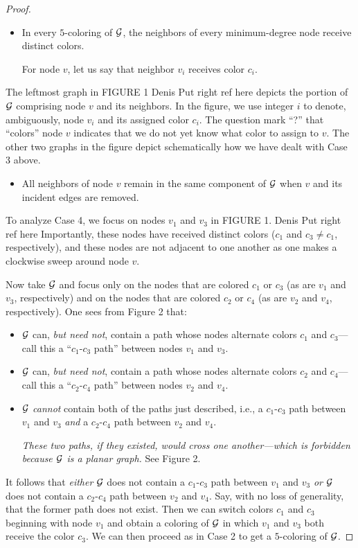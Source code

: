 {\begin{proof}
\begin{description}
\begin{itemize}
For the minimum-degree node $v$, let us call these neighbors $v_1$,
$v_2$, $v_3$, $v_4$, $v_5$, in clockwise order within the planar
drawing.
\item
In every $5$-coloring of $\mbox{$\cal G$}$, the neighbors of every minimum-degree
node receive distinct colors.

For node $v$, let us say that neighbor $v_i$ receives color $c_i$.
\end{itemize}
The leftmost graph in FIGURE 1 
{Denis Put right ref here}
depicts the portion of $\mbox{$\cal G$}$ comprising
node $v$ and its neighbors.  In the figure, we use integer $i$ to
denote, ambiguously, node $v_i$ and its assigned color $c_i$.  The
question mark ``?'' that ``colors'' node $v$ indicates that we do not
yet know what color to assign to $v$.  The other two graphs in the
figure depict schematically how we have dealt with Case 3 above.
\begin{itemize}
\item
All neighbors of node $v$ remain in the same component of $\mbox{$\cal G$}$ when
$v$ and its incident edges are removed.
\end{itemize}
\end{description}
To analyze Case 4, we focus on nodes $v_1$ and $v_3$ in FIGURE 1.
{Denis Put right ref here}
Importantly, these nodes have received distinct colors ($c_1$ and $c_3
\neq c_1$, respectively), and these nodes are not adjacent to one
another as one makes a clockwise sweep around node $v$.

Now take $\mbox{$\cal G$}$ and focus only on the nodes that are colored $c_1$ or
$c_3$ (as are $v_1$ and $v_3$, respectively) and on the nodes that are
colored $c_2$ or $c_4$ (as are $v_2$ and $v_4$, respectively).  One
sees from Figure 2 that:
\begin{itemize}
\item
$\mbox{$\cal G$}$ can, {\em but need not}, contain a path whose nodes alternate
  colors $c_1$ and $c_3$---call this a ``$c_1$-$c_3$ path'' between
  nodes $v_1$ and $v_3$.
\item
$\mbox{$\cal G$}$ can, {\em but need not}, contain a path whose nodes alternate
  colors $c_2$ and $c_4$---call this a ``$c_2$-$c_4$ path'' between
  nodes $v_2$ and $v_4$.
\item
$\mbox{$\cal G$}$ {\em cannot} contain both of the paths just described, i.e., a
  $c_1$-$c_3$ path between $v_1$ and $v_3$ {\em and} a $c_2$-$c_4$ path
  between $v_2$ and $v_4$.

{\em These two paths, if they existed, would cross one another---which
  is forbidden because $\mbox{$\cal G$}$ is a {\em planar} graph.}  See Figure 2.
\end{itemize}
It follows that {\em either} $\mbox{$\cal G$}$ does not contain a $c_1$-$c_3$ path
between $v_1$ and $v_3$ {\em or} $\mbox{$\cal G$}$ does not contain a $c_2$-$c_4$
path between $v_2$ and $v_4$.  Say, with no loss of generality, that
the former path does not exist.  Then we can switch colors $c_1$ and
$c_3$ beginning with node $v_1$ and obtain a coloring of $\mbox{$\cal G$}$ in which
$v_1$ and $v_3$ both receive the color $c_3$.  We can then proceed as
in Case 2 to get a $5$-coloring of $\mbox{$\cal G$}$.


\end{proof}}
